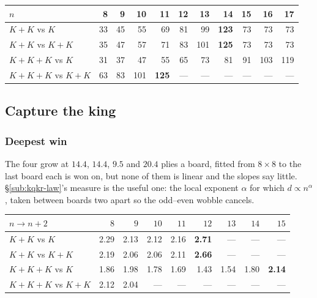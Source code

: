 \documentclass[10pt]{article}
\begin{document}
\begin{center}\small
\begin{tabular}{@{}lrrrrrrrrrr@{}}
\toprule
$n$ & 8 & 9 & 10 & 11 & 12 & 13 & \textbf{14} & 15 & 16 & 17\\
\midrule
$K\!+\!K$ vs $K$        & 33 & 45 & 55 & 69 & 81 & 99 & \textbf{123} & 73 & 73 & 73\\
$K\!+\!K$ vs $K\!+\!K$  & 35 & 47 & 57 & 71 & 83 & 101 & \textbf{125} & 73 & 73 & 73\\
$K\!+\!K\!+\!K$ vs $K$  & 31 & 37 & 47 & 55 & 65 & 73 & 81 & 91 & 103 & 119\\
$K\!+\!K\!+\!K$ vs $K\!+\!K$ & 63 & 83 & 101 & \textbf{125} & --- & --- & --- & --- & --- & ---\\
\bottomrule
\end{tabular}
\end{center}

\subsection{Capture the king}\label{sub:kings-capture}

\subsubsection{Deepest win}\label{sub:kings-rates}

\noindent
The four grow at $14.4$, $14.4$, $9.5$ and $20.4$ plies a board, fitted from
$8\times8$ to the last board each is won on, but none of them is linear and the
slopes say little. \S\ref{sub:kqkr-law}'s measure is the useful one: the local
exponent $\alpha$ for which $d\propto n^{\alpha}$, taken between boards two
apart so the odd--even wobble cancels.

\begin{center}\small
\begin{tabular}{@{}lrrrrrrrr@{}}
\toprule
$n \to n+2$ & $8$ & $9$ & $10$ & $11$ & $12$ & $13$ & $14$ & $15$\\
\midrule
$K\!+\!K$ vs $K$             & 2.29 & 2.13 & 2.12 & 2.16 & \textbf{2.71} & --- & --- & ---\\
$K\!+\!K$ vs $K\!+\!K$       & 2.19 & 2.06 & 2.06 & 2.11 & \textbf{2.66} & --- & --- & ---\\
$K\!+\!K\!+\!K$ vs $K$       & 1.86 & 1.98 & 1.78 & 1.69 & 1.43 & 1.54 & 1.80 & \textbf{2.14}\\
$K\!+\!K\!+\!K$ vs $K\!+\!K$ & 2.12 & 2.04 & --- & --- & --- & --- & --- & ---\\
\bottomrule
\end{tabular}
\end{center}
\end{document}
